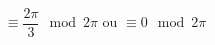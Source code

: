 \begin{displaymath}
\equiv \frac{2\pi}{3} \mod 2\pi
\text{ ou }
\equiv 0 \mod 2\pi
\end{displaymath}
